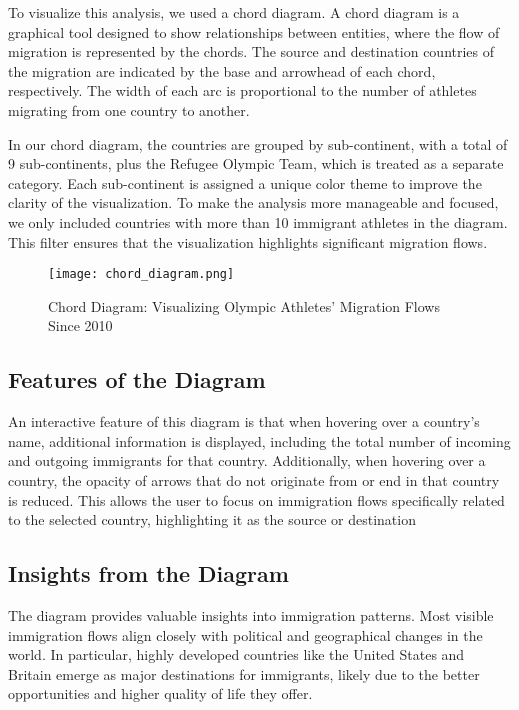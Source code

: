 To visualize this analysis, we used a chord diagram. A chord diagram is a graphical tool designed to show relationships between entities, where the flow of migration is represented by the chords. The source and destination countries of the migration are indicated by the base and arrowhead of each chord, respectively. The width of each arc is proportional to the number of athletes migrating from one country to another.

In our chord diagram, the countries are grouped by sub-continent, with a total of 9 sub-continents, plus the Refugee Olympic Team, which is treated as a separate category. Each sub-continent is assigned a unique color theme to improve the clarity of the visualization. To make the analysis more manageable and focused, we only included countries with more than 10 immigrant athletes in the diagram. This filter ensures that the visualization highlights significant migration flows.

\begin{figure}[ht]
    \centering
    \texttt{[image: chord\_diagram.png]}
    \caption{Chord Diagram: Visualizing Olympic Athletes' Migration Flows Since 2010}
    \label{fig:chord_diagram}
\end{figure}

\subsection{Features of the Diagram}
An interactive feature of this diagram is that when hovering over a country's name, additional information is displayed, including the total number of incoming and outgoing immigrants for that country. Additionally, when hovering over a country, the opacity of arrows that do not originate from or end in that country is reduced. This allows the user to focus on immigration flows specifically related to the selected country, highlighting it as the source or destination
\subsection{Insights from the Diagram}
The diagram provides valuable insights into immigration patterns. Most visible immigration flows align closely with political and geographical changes in the world. In particular, highly developed countries like the United States and Britain emerge as major destinations for immigrants, likely due to the better opportunities and higher quality of life they offer.

